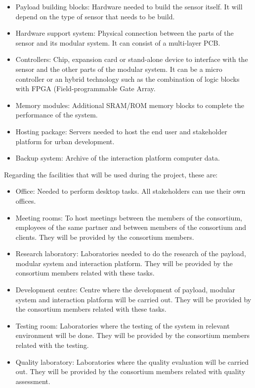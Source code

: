 \begin{itemize}
\item Payload building blocks: Hardware needed to build the sensor itself. It will depend on the type of sensor that needs to be build.
\item Hardware support system: Physical connection between the parts of the sensor and its modular system. It can consist of a multi-layer PCB.
\item Controllers: Chip, expansion card or stand-alone device to interface with the sensor and the other parts of the modular system. It can be a micro controller or an hybrid technology such as the combination of logic blocks with FPGA (Field-programmable Gate Array.
\item Memory modules: Additional SRAM/ROM memory blocks to complete the performance of the system.
\item Hosting package: Servers needed to host the end user and stakeholder platform for urban development.
\item Backup system: Archive of the interaction platform computer data. 
\end{itemize}
Regarding the facilities that will be used during the project, these are:
\begin{itemize}
\item Office: Needed to perform desktop tasks. All stakeholders can use their own offices.
\item Meeting rooms: To host meetings between the members of the consortium, employees of the same partner and between members of the consortium and clients. They will be provided by the consortium members. 
\item Research laboratory: Laboratories needed to do the research of the payload, modular system and interaction platform. They will be provided by the consortium members related with these tasks. 
\item Development centre: Centre where the development of payload, modular system and interaction platform will be carried out. They will be provided by the consortium members related with these tasks.
\item Testing room: Laboratories where the testing of the system in relevant environment will be done. They will be provided by the consortium members related with the testing.
\item Quality laboratory: Laboratories where the quality evaluation will be carried out. They will be provided by the consortium members related with quality assessment. 
\end{itemize}

